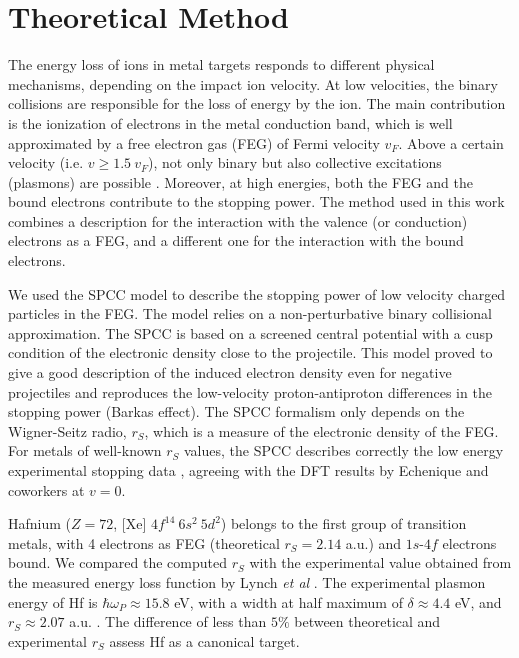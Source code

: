 \documentclass[aps,prb,reprint,groupedaddress]{revtex4-1}
\begin{document}
\section{Theoretical Method} 
\label{theory}
The energy loss of ions in metal targets responds to different physical mechanisms, depending on the impact ion velocity. At low velocities, the binary collisions are responsible for the loss of energy by the ion. The main contribution is the ionization of electrons in the metal conduction band, which is well approximated by a free electron gas (FEG) of Fermi velocity $v_F$. Above a certain velocity (i.e. $v\geq 1.5 \ v_F$), not only binary but also collective excitations (plasmons) are possible \cite{mon17}. Moreover, at high energies, both the FEG and the bound electrons contribute to the stopping power. The method used in this work combines a description for the interaction with the valence (or conduction) electrons as a FEG, and a different one for the interaction with the bound electrons.

We used the SPCC model \cite{mon17} to describe the stopping power of low velocity charged particles in the FEG. The model relies on a non-perturbative binary collisional approximation. The SPCC \cite{mon17} is based on a screened central potential with a cusp condition of the electronic density close to the projectile. This model proved to give a good description of the induced electron density even for negative projectiles \cite{mon17} and reproduces the low-velocity proton-antiproton differences in the stopping power (Barkas effect). The SPCC formalism only depends on the Wigner-Seitz radio, $r_S$, which is a measure of the electronic density of the FEG. For metals of well-known $r_S$ values, the SPCC describes correctly the low energy experimental stopping data \cite{mon17}, agreeing with the DFT results by Echenique and coworkers \cite{eche81,nagy89} at $v=0$. 

Hafnium ($Z=72$, [Xe] $4f^{14} \ 6s^2 \ 5d^2$) belongs to the first group of transition metals, with  4 electrons as FEG (theoretical $r_S=2.14$ a.u.) and $1s$-$4f$ electrons bound. We compared the computed $r_S$ with the experimental value obtained from the measured energy loss function by Lynch \textit{et al} \cite{lynch75}. The experimental plasmon energy of Hf is $\hbar\omega_P \approx 15.8$ eV, with a width at half maximum of $\delta \approx 4.4$ eV, and $r_S \approx 2.07$ a.u. \cite{lynch75}. The difference of less than $5\%$ between theoretical and experimental $r_S$ assess Hf as a canonical target\cite{mon17}.
\end{document}
